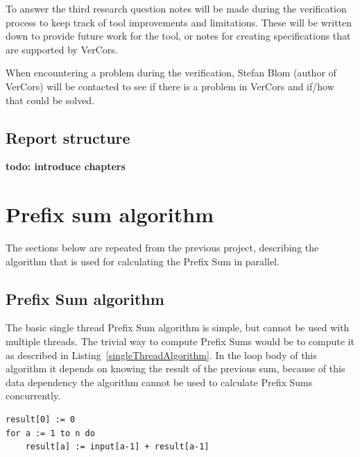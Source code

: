 \documentclass[a4paper]{article}
\newcommand{\todo}[1]{{\color{BurntOrange}\sffamily\textbf{todo: #1}\par}}
\begin{document}
To answer the third research question notes will be made during the verification process to keep track of tool improvements and limitations. These will be written down to provide future work for the tool, or notes for creating specifications that are supported by VerCors.

When encountering a problem during the verification, Stefan Blom (author of VerCors) will be contacted to see if there is a problem in VerCors and if/how that could be solved.

\subsection{Report structure}
\todo{introduce chapters}


\section{Prefix sum algorithm}
The sections below are repeated from the previous project\cite{bachelorThesis}, describing the algorithm that is used for calculating the Prefix Sum in parallel.

\subsection{Prefix Sum algorithm} \label{implementBasic}
The basic single thread Prefix Sum algorithm is simple, but cannot be used with multiple threads. The trivial way to compute Prefix Sums would be to compute it as described in Listing~\ref{singleThreadAlgorithm}. In the loop body of this algorithm it depends on knowing the result of the previous sum, because of this data dependency the algorithm cannot be used to calculate Prefix Sums concurrently. 

\begin{lstlisting}[caption=Single thread Prefix Sum, label=singleThreadAlgorithm, float=htpb]
result[0] := 0
for a := 1 to n do  
	result[a] := input[a-1] + result[a-1]
\end{lstlisting}
\end{document}
